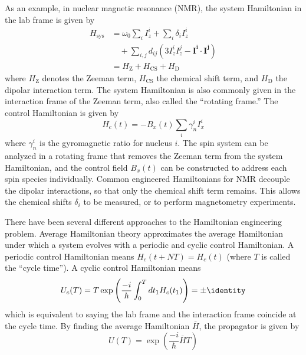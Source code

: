 \documentclass[twocolumn, aps, 10pt]{revtex4-2}
\begin{document}
As an example, in nuclear magnetic resonance (NMR), the system Hamiltonian
in the lab frame
is given by
\begin{align}\label{eq:ham_spin}
    H_\text{sys} &= \omega_0 \sum_i I_z^i
            + \sum_i \delta_i I_z^i \nonumber \\
        & \quad + \sum_{i,j} d_{ij} \left(
            3I_z^iI_z^j - \mathbf{I^i} \cdot \mathbf{I^j}
        \right) \\
    &= H_\text{Z} + H_\text{CS} + H_\text{D} \nonumber
\end{align} %
where $H_\text{Z}$ denotes the Zeeman term, $H_\text{CS}$ the chemical shift term, and $H_\text{D}$ the dipolar interaction term. The system Hamiltonian is also commonly given in the interaction frame of the Zeeman term, also called the ``rotating frame.''
The control Hamiltonian is given by
\begin{equation}
    H_c(t) = -B_x(t) \sum_i \gamma_n^i I_x^i
\end{equation}
where $\gamma_n^i$ is the gyromagnetic ratio for nucleus $i$.
The spin system can be analyzed in a rotating frame that removes the Zeeman term from the system Hamiltonian, and the control field $B_x(t)$ can be constructed to address each spin species individually.
Common engineered Hamiltonians for NMR decouple the dipolar interactions, so that only the chemical shift term remains. This allows the chemical shifts $\delta_i$ to be measured, or to perform magnetometry experiments.

There have been several different approaches to the Hamiltonian engineering problem.
Average Hamiltonian theory \cite{PhysRev.175.453} approximates the average Hamiltonian under which a system evolves with a periodic and cyclic control Hamiltonian. A periodic control Hamiltonian means $H_c(t + NT) = H_c(t)$ (where $T$ is called the ``cycle time''). A cyclic control Hamiltonian means
\begin{equation}\label{eq:cyclic_condition}
    U_c(T) = T \exp \left( \frac{-i}{\hbar} \int_0^{T} dt_1
        H_c(t_1)
    \right) = \pm \identity
\end{equation}
which is equivalent to saying the lab frame and the interaction frame coincide at the cycle time.
By finding the average Hamiltonian $\overline{H}$, the propagator is given by
\begin{equation}
    U(T) = \exp \left( \frac{-i}{\hbar} \overline{H} T \right)
\end{equation}
\end{document}
